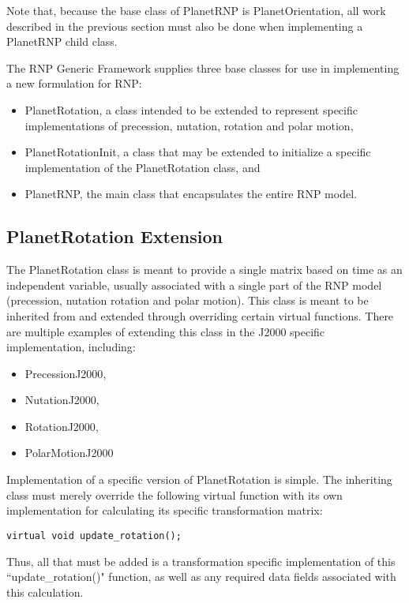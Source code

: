 Note that, because the base class of PlanetRNP is PlanetOrientation, all
work described in the previous section must also be done when implementing
a PlanetRNP child class.

The RNP Generic Framework supplies three base classes for use in implementing
a new formulation for RNP:

\begin{itemize}
\item{PlanetRotation}, a class intended to be extended to represent specific
implementations of precession, nutation, rotation and polar motion,
\item{PlanetRotationInit}, a class that may be extended to initialize
a specific implementation of the PlanetRotation class, and
\item{PlanetRNP}, the main class that encapsulates the entire RNP model.
\end{itemize}

\subsection{PlanetRotation Extension}

The PlanetRotation class is meant to provide a single matrix based on time as
an independent variable, usually associated with a single part of the RNP model
(precession, nutation rotation and polar motion). This class is meant to be
inherited from and extended through overriding certain virtual functions. There
are multiple examples of extending this class in the J2000 specific
implementation, including:

\begin{itemize}
\item{PrecessionJ2000},
\item{NutationJ2000},
\item{RotationJ2000},
\item{PolarMotionJ2000}
\end{itemize}

Implementation of a specific version of PlanetRotation is simple. The inheriting
class must merely override the following virtual function with its own
implementation for calculating its specific transformation matrix:

\begin{verbatim}
virtual void update_rotation();
\end{verbatim}

Thus, all that must be added is a transformation specific implementation of
this ``update\_rotation()" function, as well as any required data fields
associated with this calculation.

